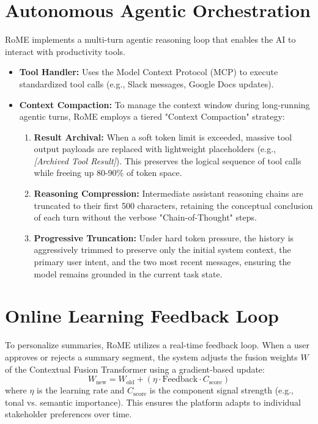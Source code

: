 \section{Autonomous Agentic Orchestration}
RoME implements a multi-turn agentic reasoning loop that enables the AI to interact with productivity tools. 
\begin{itemize}
    \item \textbf{Tool Handler:} Uses the Model Context Protocol (MCP) to execute standardized tool calls (e.g., Slack messages, Google Docs updates).
    \item \textbf{Context Compaction:} To manage the context window during long-running agentic turns, RoME employs a tiered "Context Compaction" strategy:
    \begin{enumerate}
        \item \textbf{Result Archival:} When a soft token limit is exceeded, massive tool output payloads are replaced with lightweight placeholders (e.g., \textit{[Archived Tool Result]}). This preserves the logical sequence of tool calls while freeing up 80-90\% of token space.
        \item \textbf{Reasoning Compression:} Intermediate assistant reasoning chains are truncated to their first 500 characters, retaining the conceptual conclusion of each turn without the verbose "Chain-of-Thought" steps.
        \item \textbf{Progressive Truncation:} Under hard token pressure, the history is aggressively trimmed to preserve only the initial system context, the primary user intent, and the two most recent messages, ensuring the model remains grounded in the current task state.
    \end{enumerate}
\end{itemize}

\section{Online Learning Feedback Loop}
To personalize summaries, RoME utilizes a real-time feedback loop. When a user approves or rejects a summary segment, the system adjusts the fusion weights $W$ of the Contextual Fusion Transformer using a gradient-based update:
\begin{equation}
W_{\text{new}} = W_{\text{old}} + (\eta \cdot \text{Feedback} \cdot C_{\text{score}})
\end{equation}
where $\eta$ is the learning rate and $C_{\text{score}}$ is the component signal strength (e.g., tonal vs. semantic importance). This ensures the platform adapts to individual stakeholder preferences over time.
